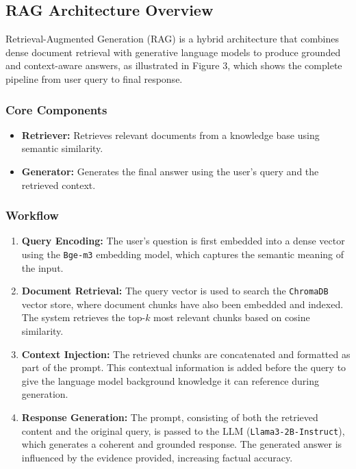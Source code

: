 \subsection{RAG Architecture Overview}
\label{subsec:rag-architecture}

Retrieval-Augmented Generation (RAG) is a hybrid architecture that combines dense document retrieval with generative language models to produce grounded and context-aware answers, as illustrated in Figure 3, which shows the complete pipeline from user query to final response.


\subsubsection*{Core Components}
\begin{itemize}
    \item \textbf{Retriever:} Retrieves relevant documents from a knowledge base using semantic similarity.
    \item \textbf{Generator:} Generates the final answer using the user's query and the retrieved context.
\end{itemize}

\subsubsection*{Workflow}
\begin{enumerate}
    \item \textbf{Query Encoding:}
    The user's question is first embedded into a dense vector using the \texttt{Bge-m3} embedding model, which captures the semantic meaning of the input.
    
    \item \textbf{Document Retrieval:}
    The query vector is used to search the \texttt{ChromaDB} vector store, where document chunks have also been embedded and indexed. The system retrieves the top-$k$ most relevant chunks based on cosine similarity.
    
    \item \textbf{Context Injection:}
    The retrieved chunks are concatenated and formatted as part of the prompt. This contextual information is added before the query to give the language model background knowledge it can reference during generation.
    
    \item \textbf{Response Generation:}
    The prompt, consisting of both the retrieved content and the original query, is passed to the LLM (\texttt{Llama3-2B-Instruct}), which generates a coherent and grounded response. The generated answer is influenced by the evidence provided, increasing factual accuracy.
\end{enumerate}

